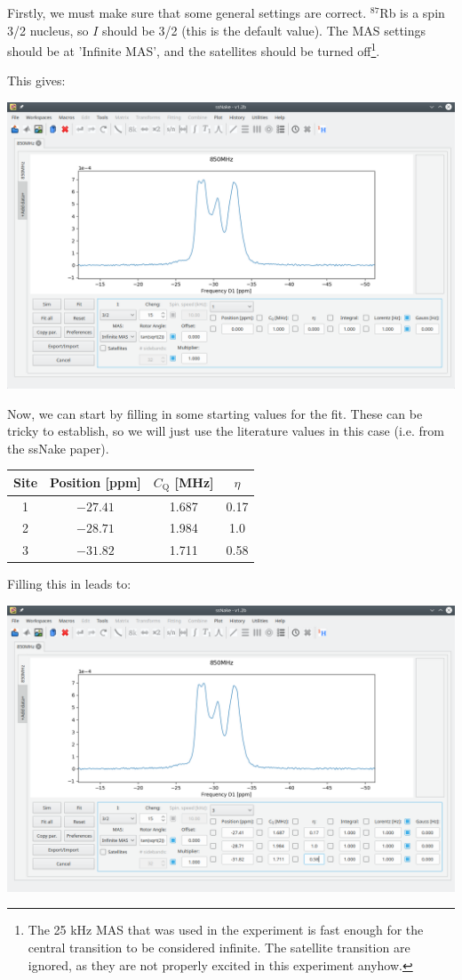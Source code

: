 \documentclass[11pt,a4paper]{article}
\begin{document}
Firstly, we must make sure that some general settings are correct. $^{87}$Rb is a spin 3/2 nucleus, so
$I$ should be 3/2 (this is the default value). The MAS settings should be at 'Infinite MAS', and the
satellites should be turned off\footnote{The 25 kHz MAS that was used in the experiment is fast enough
for the central transition to be considered infinite. The satellite transition are ignored, as they
are not properly excited in this experiment anyhow.}.

This gives:
\begin{center}
\includegraphics[width=1.0\linewidth]{Figs/Fig3.png}
\end{center}

Now, we can start by filling in some starting values for the fit. These can be tricky to establish, so we
will just use the literature values in this case (i.e. from the ssNake paper).

\begin{center}
  \begin{tabular}{cccc}
	 \toprule
	 Site & Position [ppm] & $C_\text{Q}$ [MHz] & $\eta$\\
	 \midrule
	 1 & $-27.41$ & 1.687 & 0.17\\
	 2 & $-28.71$ & 1.984 & 1.0\\
	 3 & $-31.82$ & 1.711 & 0.58\\
	 \bottomrule
  \end{tabular}
\end{center}
Filling this in leads to:
\begin{center}
\includegraphics[width=1.0\linewidth]{Figs/Fig4.png}
\end{center}
\end{document}
